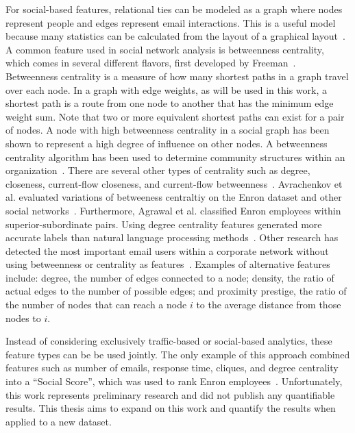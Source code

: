 \documentclass[12pt]{report}
\begin{document}
For social-based features, relational ties can be modeled as a graph where nodes represent people and edges represent email interactions.
This is a useful model because many statistics can be calculated from the layout of a graphical layout~\cite{wasserman_social_1994}.
A common feature used in social network analysis is betweenness centrality, which comes in several different flavors, first developed by Freeman~\cite{freeman_set_1977}.
Betweenness centrality is a measure of how many shortest paths in a graph travel over each node.
In a graph with edge weights, as will be used in this work, a shortest path is a route from one node to another that has the minimum edge weight sum.
Note that two or more equivalent shortest paths can exist for a pair of nodes.
A node with high betweenness centrality in a social graph has been shown to represent a high degree of influence on other nodes.
A betweenness centrality algorithm has been used to determine community structures within an organization~\cite{tyler_email_2003}.
There are several other types of centrality such as degree, closeness, current-flow closeness, and current-flow betweenness~\cite{balinsky2011rapid}.
Avrachenkov et al. evaluated variations of betweeness centraltiy on the Enron dataset and other social networks~\cite{avrachenkov2013alpha}.
Furthermore, Agrawal et al. classified Enron employees within superior-subordinate pairs.
Using degree centrality features generated more accurate labels than natural language processing methods~\cite{agarwal_comprehensive_2012}.
Other research has detected the most important email users within a corporate network without using betweenness or centrality as features~\cite{wilson_discovery_2009}.
Examples of alternative features include: degree, the number of edges connected to a node; density, the ratio of actual edges to the number of possible edges; and proximity prestige, the ratio of the number of nodes that can reach a node $i$ to the average distance from those nodes to $i$.

Instead of considering exclusively traffic-based or social-based analytics, these feature types can be be used jointly.
The only example of this approach combined features such as number of emails, response time, cliques, and degree centrality into a ``Social Score'', which was used to rank Enron employees~\cite{rowe_automated_2007}.  
Unfortunately, this work represents preliminary research and did not publish any quantifiable results.
This thesis aims to expand on this work and quantify the results when applied to a new dataset.
\end{document}
